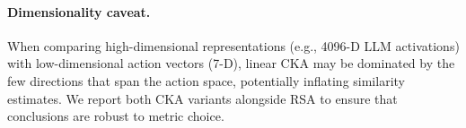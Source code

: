 \paragraph{Dimensionality caveat.}
When comparing high-dimensional representations (e.g., 4096-D LLM activations) with low-dimensional action vectors (7-D), linear CKA may be dominated by the few directions that span the action space, potentially inflating similarity estimates.
We report both CKA variants alongside RSA to ensure that conclusions are robust to metric choice.
